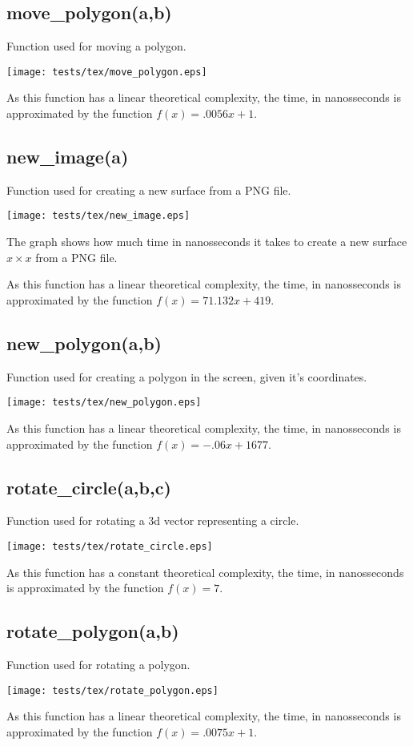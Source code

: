 \documentclass{article}
\begin{document}
\subsection{move\_polygon(a,b)}
Function used for moving a polygon.

\texttt{[image: tests/tex/move\_polygon.eps]}

As this function has a linear theoretical
complexity, the time, in nanosseconds is 
approximated by the function $f(x)=.0056x+1$.
\subsection{new\_image(a)}
Function used for creating a new surface from a PNG file.

\texttt{[image: tests/tex/new\_image.eps]}

The graph shows how much time in nanosseconds it takes to create a new surface $x \times x $ from a PNG file.

As this function has a linear theoretical
complexity, the time, in nanosseconds is 
approximated by the function $f(x)=71.132x+419$.
\subsection{new\_polygon(a,b)}
Function used for creating a polygon in the
screen, given it's coordinates. 

\texttt{[image: tests/tex/new\_polygon.eps]}

As this function has a linear theoretical
complexity, the time, in nanosseconds is 
approximated by the function $f(x)=-.06x+1677$.
\subsection{rotate\_circle(a,b,c)}
Function used for rotating a 3d vector representing a circle.


\texttt{[image: tests/tex/rotate\_circle.eps]}

As this function has a constant theoretical
complexity, the time, in nanosseconds is 
approximated by the function $f(x)=7$.
\subsection{rotate\_polygon(a,b)}
Function used for rotating a polygon.

\texttt{[image: tests/tex/rotate\_polygon.eps]}

As this function has a linear theoretical
complexity, the time, in nanosseconds is 
approximated by the function $f(x)=.0075x+1$.
\end{document}
